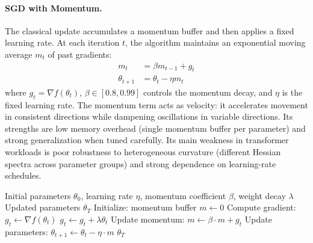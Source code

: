 \paragraph{SGD with Momentum.}
The classical update accumulates a momentum buffer and then applies a fixed learning rate. At each iteration $t$, the algorithm maintains an exponential moving average $m_t$ of past gradients:
\begin{align}
m_t &= \beta m_{t-1} + g_t \\
\theta_{t+1} &= \theta_t - \eta m_t
\end{align}
where $g_t = \nabla f(\theta_t)$, $\beta \in [0.8, 0.99]$ controls the momentum decay, and $\eta$ is the fixed learning rate. The momentum term acts as velocity: it accelerates movement in consistent directions while dampening oscillations in variable directions. Its strengths are low memory overhead (single momentum buffer per parameter) and strong generalization when tuned carefully. Its main weakness in transformer workloads is poor robustness to heterogeneous curvature (different Hessian spectra across parameter groups) and strong dependence on learning-rate schedules.

\begin{algorithm}[H]
\caption{SGD with Momentum}
\label{alg:sgd-momentum}
\begin{algorithmic}[1]
\Require Initial parameters $\theta_0$, learning rate $\eta$, momentum coefficient $\beta$, weight decay $\lambda$
\Ensure Updated parameters $\theta_T$
\State Initialize: momentum buffer $m \gets 0$
    \State Compute gradient: $g_t \gets \nabla f(\theta_t)$
        \State $g_t \gets g_t + \lambda \theta_t$ 
    \EndIf
    \State Update momentum: $m \gets \beta \cdot m + g_t$
    \State Update parameters: $\theta_{t+1} \gets \theta_t - \eta \cdot m$
\EndFor
\Return $\theta_T$
\end{algorithmic}
\end{algorithm}

